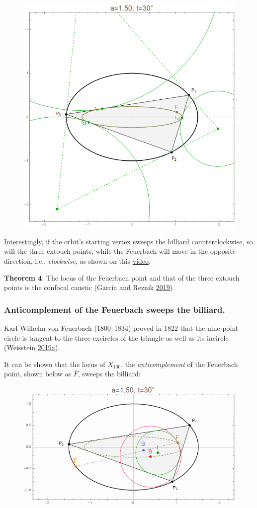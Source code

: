 \documentclass[]{article}
\begin{document}
\begin{figure}[H]

{\centering \includegraphics[width=0.5\linewidth]{pics/caustic30} 

}

\end{figure}

Interestingly, if the orbit's starting vertex sweeps the billiard counterclockwise, so will the three extouch points, while the Feuerbach will move in the opposite direction, i.e., \emph{clockwise}, as shown on this \href{https://youtu.be/1gYb5Y3-rQI}{video}.

\textbf{Theorem 4}: The locus of the Feuerbach point and that of the three extouch points is the confocal caustic (Garcia and Reznik \protect\hyperlink{ref-garcia19a}{2019})

\hypertarget{anticomplement-of-the-feuerbach-sweeps-the-billiard.}{%
\subsubsection{Anticomplement of the Feuerbach sweeps the billiard.}\label{anticomplement-of-the-feuerbach-sweeps-the-billiard.}}

Karl Wilhelm von Feuerbach (1800--1834) proved in 1822 that the nine-point circle is tangent to the three excircles of the triangle as well as its incircle (Weisstein \protect\hyperlink{ref-mw}{2019}\protect\hyperlink{ref-mw}{a}).

It can be shown that the locus of \(X_{100}\), the \emph{anticomplement} of the Feuerbach point, shown below as \(\bar{F}\), sweeps the billiard:

\begin{figure}[H]

{\centering \includegraphics[width=0.66\linewidth]{pics/antifeuerbach} 

}

\end{figure}
\end{document}
